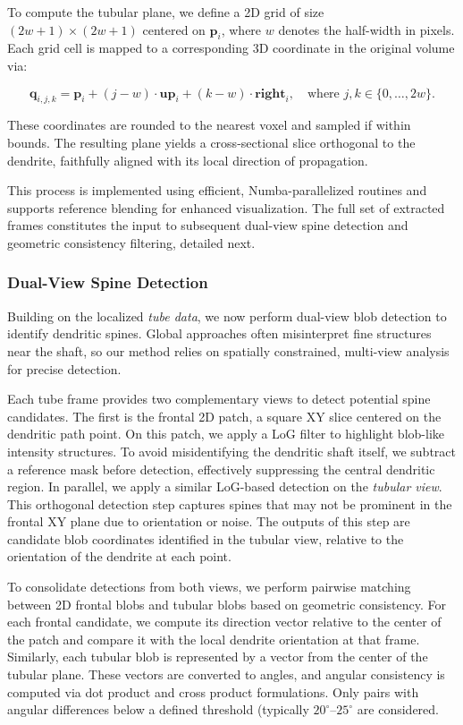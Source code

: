 To compute the tubular plane, we define a 2D grid of size \((2w + 1) \times (2w + 1)\) centered on \(\mathbf{p}_i\), where \(w\) denotes the half-width in pixels. Each grid cell is mapped to a corresponding 3D coordinate in the original volume via:

\[
\mathbf{q}_{i,j,k} = \mathbf{p}_i + (j - w) \cdot \mathbf{up}_i + (k - w) \cdot \mathbf{right}_i,
\quad \text{where } j, k \in \{0, \ldots, 2w\}.
\]



These coordinates are rounded to the nearest voxel and sampled if within bounds. The resulting plane yields a cross-sectional slice orthogonal to the dendrite, faithfully aligned with its local direction of propagation.

This process is implemented using efficient, Numba-parallelized routines and supports reference blending for enhanced visualization. The full set of extracted frames constitutes the input to subsequent dual-view spine detection and geometric consistency filtering, detailed next.

\subsubsection{\textbf{Dual-View Spine Detection}}
Building on the localized \textit{tube data}, we now perform dual-view blob detection to identify dendritic spines. Global approaches often misinterpret fine structures near the shaft, so our method relies on spatially constrained, multi-view analysis for precise detection.

Each tube frame provides two complementary views to detect potential spine candidates. The first is the frontal 2D patch, a square XY slice centered on the dendritic path point. On this patch, we apply a \gls{LoG} \cite{Kong_2013} filter to highlight blob-like intensity structures. To avoid misidentifying the dendritic shaft itself, we subtract a reference mask before detection, effectively suppressing the central dendritic region. In parallel, we apply a similar \gls{LoG}-based detection on the \textit{tubular view}. This orthogonal detection step captures spines that may not be prominent in the frontal XY plane due to orientation or noise. The outputs of this step are candidate blob coordinates identified in the tubular view, relative to the orientation of the dendrite at each point.

To consolidate detections from both views, we perform pairwise matching between 2D frontal blobs and tubular blobs based on geometric consistency. For each frontal candidate, we compute its direction vector relative to the center of the patch and compare it with the local dendrite orientation at that frame. Similarly, each tubular blob is represented by a vector from the center of the tubular plane. These vectors are converted to angles, and angular consistency is computed via dot product and cross product formulations. Only pairs with angular differences below a defined threshold (typically \(20^\circ\text{–}25^\circ\) are considered.

